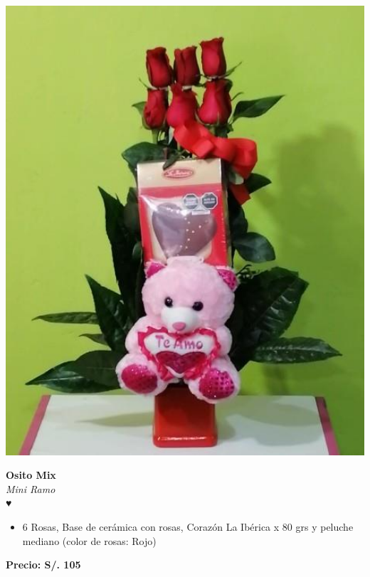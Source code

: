 \documentclass[12pt]{article}
\begin{document}
\vspace{1cm}
\noindent
\begin{minipage}{0.35\textwidth}
    \includegraphics[width=1.0\textwidth]{imagenes_extraidas/image_7_3}
\end{minipage}
\hspace{1cm}
\begin{minipage}{0.6\textwidth}
    \textcolor[HTML]{FF8C00}{\textbf{\huge Osito Mix }}\\
    {\textit{Mini Ramo}} \\
    \textcolor[HTML]{FF8C00}{\Huge ♥} \\
    \vspace{0.5cm}
    \begin{itemize}
        \item 6 Rosas, Base de cerámica con rosas, Corazón La Ibérica x 80 grs y peluche mediano (color de rosas: Rojo)
    \end{itemize}
\end{minipage}
\vspace{0.3cm}
\begin{center}
   \textbf{\Large Precio: \textcolor[HTML]{228B22}{S/. 105 }}
\end{center}
\end{document}
